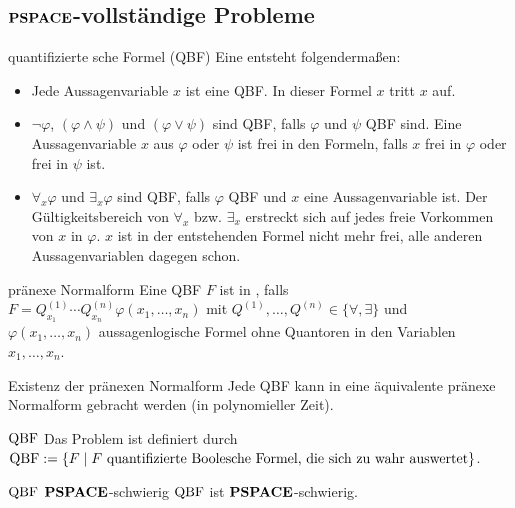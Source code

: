 \pagebreak

\subsection{%
    \texorpdfstring{$\mathbf{PSPACE}$}{PSPACE}-vollständige Probleme%
}

\begin{Def}{quantifizierte sche Formel (QBF)}
    Eine  entsteht folgendermaßen:
    \begin{itemize}
        \item
        Jede Aussagenvariable $x$ ist eine QBF.
        In dieser Formel $x$ tritt $x$  auf.
        
        \item
        $\lnot \varphi$, $(\varphi \land \psi)$ und $(\varphi \lor \psi)$ sind QBF,
        falls $\varphi$ und $\psi$ QBF sind.
        Eine Aussagenvariable $x$ aus $\varphi$ oder $\psi$ ist frei in den Formeln,
        falls $x$ frei in $\varphi$ oder frei in $\psi$ ist.
        
        \item
        $\forall_x \varphi$ und $\exists_x \varphi$ sind QBF,
        falls $\varphi$ QBF und $x$ eine Aussagenvariable ist.
        Der Gültigkeitsbereich von $\forall_x$ bzw. $\exists_x$ erstreckt sich auf jedes
        freie Vorkommen von $x$ in $\varphi$.
        $x$ ist in der entstehenden Formel nicht mehr frei,
        alle anderen Aussagenvariablen dagegen schon.
    \end{itemize}
\end{Def}

\begin{Def}{pränexe Normalform}
    Eine QBF $F$ ist in , falls\\
    $F = Q^{(1)}_{x_1} \dotsb Q^{(n)}_{x_n} \varphi(x_1, \dotsc, x_n)$ mit
    $Q^{(1)}, \dotsc, Q^{(n)} \in \{\forall, \exists\}$ und\\
    $\varphi(x_1, \dotsc, x_n)$ aussagenlogische Formel ohne Quantoren in den Variablen
    $x_1, \dotsc, x_n$.
\end{Def}

\begin{Satz}{Existenz der pränexen Normalform}
    Jede QBF kann in eine äquivalente pränexe Normalform gebracht werden
    (in polynomieller Zeit).
\end{Satz}

\linie

\begin{Def}{$\QBF$}
    Das Problem \begriff{$\QBF$} ist definiert durch\\
    $\text{QBF} := \{F \;|\; F \text{ quantifizierte Boolesche Formel, die sich zu wahr auswertet}\}$.
\end{Def}

\begin{Satz}{$\QBF$ $\mathbf{PSPACE}$-schwierig}
    $\QBF$ ist $\mathbf{PSPACE}$-schwierig.
\end{Satz}

\pagebreak
